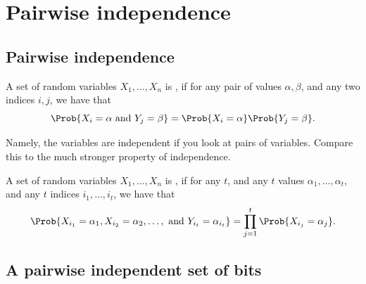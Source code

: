 \makeatletter
{}
\makeatother
\ifx\bookMode\undefined%
\fi
{}



\ChapterPrefix{}
\ChapterGen{}




\section{Pairwise independence}

\subsection{Pairwise independence}

\begin{defn}
    A set of random variables $X_1, \ldots, X_n$ is , if for any pair of values $\alpha, \beta$, and
    any two indices $i,j$, we have that
    \begin{equation*}
        \Prob{X_i =\alpha \text{ and } Y_j = \beta}%
        =%
        \Prob{X_i =\alpha} \Prob{ Y_j = \beta}.
    \end{equation*}
\end{defn}

Namely, the variables are independent if you look at pairs of
variables. Compare this to the much stronger property of independence.
\begin{defn}
    A set of random variables $X_1, \ldots, X_n$ is
    , if for any $t$, and any $t$ values
    $\alpha_1, \ldots, \alpha_t$, and any $t$ indices
    $i_1,\ldots, i_t$, we have that
    \begin{equation*}
        \Prob{X_{i_1} =\alpha_1, X_{i_2} =\alpha_2,\ldots,
           \text{ and } Y_{i_t} = \alpha_{i_t}}%
        =%
        \prod_{j=1}^t
        \Prob{X_{i_j} =\alpha_j}.
    \end{equation*}
\end{defn}


\subsection{A pairwise independent set of bits}
%

